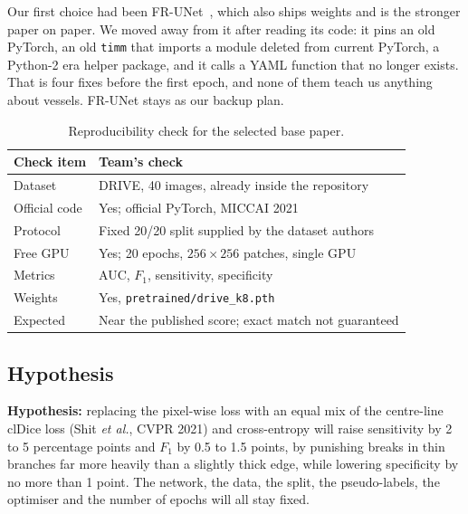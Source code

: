 \documentclass[conference]{IEEEtran}
\begin{document}
Our first choice had been FR-UNet~\cite{frunet}, which also ships weights and
is the stronger paper on paper. We moved away from it after reading its code:
it pins an old PyTorch, an old \texttt{timm} that imports a module deleted from
current PyTorch, a Python-2 era helper package, and it calls a YAML function
that no longer exists. That is four fixes before the first epoch, and none of
them teach us anything about vessels. FR-UNet stays as our backup plan.

\begin{table}[!t]
  \caption{Reproducibility check for the selected base paper.}
  \label{tab:checklist}
  \centering
  \renewcommand{\arraystretch}{1.18}
  \setlength{\tabcolsep}{5pt}
  \begin{tabular}{@{} l p{5.4cm} @{}}
    \toprule
    \textbf{Check item} & \textbf{Team's check}                                   \\
    \midrule
    Dataset             & DRIVE, 40 images, already inside the repository         \\
    Official code       & Yes; official PyTorch, MICCAI 2021                      \\
    Protocol            & Fixed 20/20 split supplied by the dataset authors       \\
    Free GPU            & Yes; 20 epochs, $256\times256$ patches, single GPU      \\
    Metrics             & AUC, $F_1$, sensitivity, specificity                    \\
    Weights             & Yes, \texttt{pretrained/drive\_k8.pth}                  \\
    Expected            & Near the published score; exact match not guaranteed    \\
    \bottomrule
  \end{tabular}
\end{table}

\subsection{Hypothesis}

\textbf{Hypothesis:} replacing the pixel-wise loss with an equal mix of the
centre-line clDice loss (Shit \textit{et al.}, CVPR 2021) and cross-entropy
will raise sensitivity by 2 to 5 percentage points and $F_1$ by 0.5 to 1.5
points, by punishing breaks in thin branches far more heavily than a slightly
thick edge, while lowering specificity by no more than 1 point. The network,
the data, the split, the pseudo-labels, the optimiser and the number of epochs
will all stay fixed.
\end{document}
